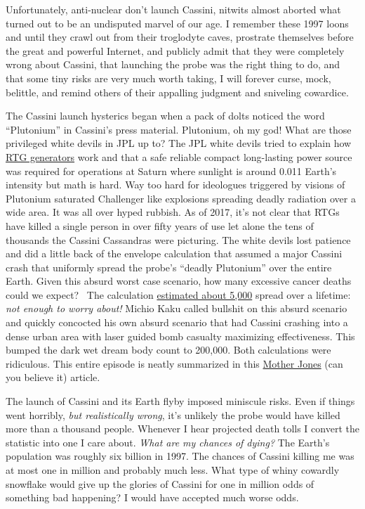 Unfortunately, anti-nuclear don't launch Cassini, nitwits almost aborted
what turned out to be an undisputed marvel of our age. I remember these
1997 loons and until they crawl out from their troglodyte caves,
prostrate themselves before the great and powerful Internet, and
publicly admit that they were completely wrong about Cassini, that
launching the probe was the right thing to do, and that some tiny risks
are very much worth taking, I will forever curse, mock, belittle, and
remind others of their appalling judgment and sniveling cowardice.

The Cassini launch hysterics began when a pack of dolts noticed the word
``Plutonium'' in Cassini's press material. Plutonium, oh my god! What
are those privileged white devils in JPL up to? The JPL white devils
tried to explain how
\href{https://saturn.jpl.nasa.gov/radioisotope-thermoelectric-generator/}{RTG
generators} work and that a safe reliable compact long-lasting power
source was required for operations at Saturn where sunlight is around
0.011 Earth's intensity but math is hard. Way too hard for ideologues
triggered by visions of Plutonium saturated Challenger like explosions
spreading deadly radiation over a wide area. It was all over hyped
rubbish. As of 2017, it's not clear that RTGs have killed a single
person in over fifty years of use let alone the tens of thousands the
Cassini Cassandras were picturing. The white devils lost patience and
did a little back of the envelope calculation that assumed a major
Cassini crash that uniformly spread the probe's ``deadly Plutonium''
over the entire Earth. Given this absurd worst case scenario, how many
excessive cancer deaths could we expect?~ The calculation
\href{https://en.wikipedia.org/wiki/Cassini\%E2\%80\%93Huygens}{estimated
about 5,000} spread over a lifetime: \emph{not enough to worry about!}
Michio Kaku called bullshit on this absurd scenario and quickly
concocted his own absurd scenario that had Cassini crashing into a dense
urban area with laser guided bomb casualty maximizing effectiveness.
This bumped the dark wet dream body count to 200,000. Both calculations
were ridiculous. This entire episode is neatly summarized in this
\href{http://www.motherjones.com/politics/1997/09/cassini-controversy/}{Mother
Jones} (can you believe it) article.

The launch of Cassini and its Earth flyby imposed miniscule risks. Even
if things went horribly, \emph{but realistically wrong}, it's unlikely
the probe would have killed more than a thousand people. Whenever I hear
projected death tolls I convert the statistic into one I care about.
\emph{What are my chances of dying?} The Earth's population was roughly
six billion in 1997. The chances of Cassini killing me was at most one
in million and probably much less. What type of whiny cowardly snowflake
would give up the glories of Cassini for one in million odds of
something bad happening? I would have accepted much worse odds.

